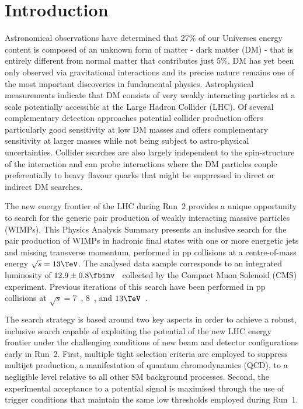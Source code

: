 \section{Introduction}
\label{sec:introduction}

Astronomical observations have determined that 27\% of our Universes
energy content is composed of an unknown form of matter - dark matter
(DM) - that is entirely different from normal matter that contributes
just 5\%. DM has yet been only observed via gravitational interactions
and its precise nature remains one of the most important discoveries
in fundamental physics.  Astrophysical measurements indicate that DM
consists of very weakly interacting particles at a scale potentially
accessible at the Large Hadron Collider (LHC). Of several
complementary detection approaches potential collider production
offers particularly good sensitivity at low DM masses and offers
complementary sensitivity at larger masses while not being subject to
astro-physical uncertainties. Collider searches are also largely
independent to the spin-structure of the interaction and can
probe interactions where the DM particles couple preferentially to heavy flavour quarks that might be suppressed
in direct or indirect DM searches.

The new energy frontier of the LHC during Run~2 provides a unique
opportunity to search for the generic pair production of weakly interacting massive particles (WIMPs). This Physics Analysis Summary presents an inclusive search for the pair production of WIMPs in hadronic final states with one or more energetic jets and
missing transverse momentum, performed in pp collisions at a
centre-of-mass energy $\sqrt{s} = 13\TeV$. The analysed data sample
corresponds to an integrated luminosity of $12.9 \pm 0.8
\fbinv$~\cite{lumi} collected by the Compact Muon Solenoid (CMS)
experiment. Previous iterations of this search have been performed in
pp collisions at $\sqrt{s} = 7$~\cite{RA1Paper, RA1Paper2011,
  RA1Paper2011FULL}, $8$~\cite{RA1Paper2012, RA1Parked}, and
$13\TeV$~\cite{RA1Paper2015}.

The search strategy is based around two key aspects in order to
achieve a robust, inclusive search capable of exploiting the potential
of the new LHC energy frontier under the challenging conditions of new
beam and detector configurations early in Run~2. First, multiple tight
selection criteria are employed to suppress multijet production, a
manifestation of quantum chromodynamics (QCD), to a negligible level
relative to all other SM background processes. Second, the
experimental acceptance to a potential signal is maximised through the
use of trigger conditions that maintain the same low thresholds
employed during Run~1.

